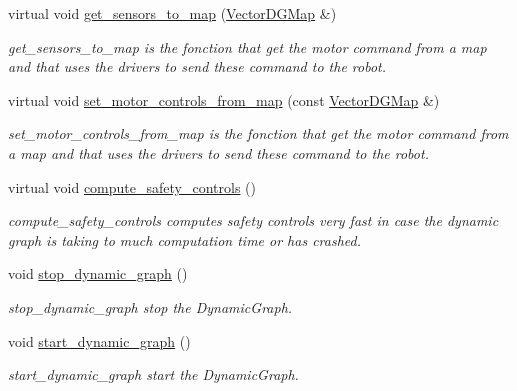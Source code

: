 \begin{DoxyCompactItemize}
virtual void \hyperlink{classdynamic__graph_1_1DynamicGraphManager_a7bddce83d5185433041ad27610b85b3a}{get\+\_\+sensors\+\_\+to\+\_\+map} (\hyperlink{namespacedynamic__graph_abd184187f3bc15df5e227d866529e4a7}{Vector\+D\+G\+Map} \&)
\begin{DoxyCompactList}\small\item\em get\+\_\+sensors\+\_\+to\+\_\+map is the fonction that get the motor command from a map and that uses the drivers to send these command to the robot. \end{DoxyCompactList}\item 
virtual void \hyperlink{classdynamic__graph_1_1DynamicGraphManager_a506e6f37ac7205efaf0efe4202cde897}{set\+\_\+motor\+\_\+controls\+\_\+from\+\_\+map} (const \hyperlink{namespacedynamic__graph_abd184187f3bc15df5e227d866529e4a7}{Vector\+D\+G\+Map} \&)
\begin{DoxyCompactList}\small\item\em set\+\_\+motor\+\_\+controls\+\_\+from\+\_\+map is the fonction that get the motor command from a map and that uses the drivers to send these command to the robot. \end{DoxyCompactList}\item 
\mbox{\label{classdynamic__graph_1_1DynamicGraphManager_a60bb31040121d6041b4dd6556f5c7eac}} 
virtual void \hyperlink{classdynamic__graph_1_1DynamicGraphManager_a60bb31040121d6041b4dd6556f5c7eac}{compute\+\_\+safety\+\_\+controls} ()
\begin{DoxyCompactList}\small\item\em compute\+\_\+safety\+\_\+controls computes safety controls very fast in case the dynamic graph is taking to much computation time or has crashed. \end{DoxyCompactList}\item 
void \hyperlink{classdynamic__graph_1_1DynamicGraphManager_ad3c7c528ef283fbfb803377c8c631b4c}{stop\+\_\+dynamic\+\_\+graph} ()
\begin{DoxyCompactList}\small\item\em stop\+\_\+dynamic\+\_\+graph stop the Dynamic\+Graph. \end{DoxyCompactList}\item 
void \hyperlink{classdynamic__graph_1_1DynamicGraphManager_a1bfd2b965dde19d12d63f5928a4f670c}{start\+\_\+dynamic\+\_\+graph} ()
\begin{DoxyCompactList}\small\item\em start\+\_\+dynamic\+\_\+graph start the Dynamic\+Graph. \end{DoxyCompactList}\item 

\end{DoxyCompactItemize}
